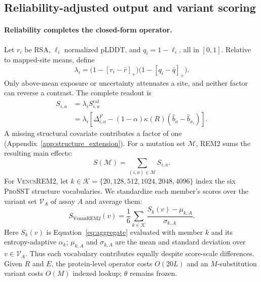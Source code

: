 \documentclass{article} %
\begin{document}


\subsection{Reliability-adjusted output and variant scoring}
\label{sec:shrinkage}
\label{sec:ranking}

\paragraph{Reliability completes the closed-form operator.}
Let $r_i$ be RSA, $\ell_i$ normalized pLDDT, and $q_i=1-\ell_i$, all in $[0,1]$. Relative to mapped-site means, define
\begin{equation}
\lambda_i
=\bigl(1-[r_i-\bar r]_+\bigr)
 \bigl(1-[q_i-\bar q]_+\bigr).
\label{eq:lambda}
\end{equation}
Only above-mean exposure or uncertainty attenuates a site, and neither factor can reverse a contrast. The complete readout is
\begin{equation}
\begin{aligned}
S_{i,a}
&=\lambda_i S^{\mathrm{cal}}_{i,a}\\
&=\lambda_i\!\left[\Delta^F_{i,a}
 -(1-\alpha)\kappa(R)(\widehat b_a-\widehat b_{x_i})\right].
\end{aligned}
\label{eq:final_field}
\end{equation}
A missing structural covariate contributes a factor of one (Appendix~\ref{app:structure_extension}). For a mutation set $\mathcal M$, \textsc{REM2} sums the resulting main effects:
\begin{equation}
S(\mathcal M)=\sum_{(i,a)\in\mathcal M}S_{i,a}.
\label{eq:aggregate}
\end{equation}
For \textsc{VenusREM2}, let $k\in\mathcal K=\{20,128,512,1024,2048,4096\}$ index the six \textsc{ProSST} structure vocabularies. We standardize each member's scores over the variant set $\mathcal V_A$ of assay $A$ and average them:
\begin{equation}
S_{\mathrm{VenusREM2}}(v)
=\frac{1}{6}\sum_{k\in\mathcal K}
\frac{S_k(v)-\mu_{k,A}}{\sigma_{k,A}}.
\label{eq:prosst_ensemble}
\end{equation}
Here $S_k(v)$ is Equation~\ref{eq:aggregate} evaluated with member $k$ and its entropy-adaptive $\alpha_k$; $\mu_{k,A}$ and $\sigma_{k,A}$ are the mean and standard deviation over $v\in\mathcal V_A$. Thus each vocabulary contributes equally despite score-scale differences.
Given $R$ and $E$, the protein-level operator costs $O(20L)$ and an $M$-substitution variant costs $O(M)$ indexed lookup; $\theta$ remains frozen.
\end{document}
